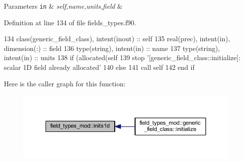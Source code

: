 \begin{DoxyParams}[1]{Parameters}
\mbox{\tt in}  & {\em self,name,units,field} & \\
\hline
\end{DoxyParams}


Definition at line 134 of file fields\+\_\+types.\+f90.


\begin{DoxyCode}
134     \textcolor{keywordtype}{class}(generic\_field\_class), \textcolor{keywordtype}{intent(inout)} :: self
135     \textcolor{keywordtype}{real(prec)}, \textcolor{keywordtype}{intent(in)}, \textcolor{keywordtype}{dimension(:)} :: field
136     \textcolor{keywordtype}{type}(string), \textcolor{keywordtype}{intent(in)} :: name
137     \textcolor{keywordtype}{type}(string), \textcolor{keywordtype}{intent(in)} :: units
138     \textcolor{keywordflow}{if} (\textcolor{keyword}{allocated}(self%
139         stop \textcolor{stringliteral}{'[generic\_field\_class::initialize]: scalar 1D field already allocated'}
140     \textcolor{keywordflow}{else}
141         \textcolor{keyword}{call }self%
142 \textcolor{keywordflow}{    end if}
\end{DoxyCode}
Here is the caller graph for this function\+:\nopagebreak
\begin{figure}[H]
\begin{center}
\leavevmode
\includegraphics[width=350pt]{namespacefield__types__mod_ae4985a4f37aad76b5bd9d4fdbdec8ff3_icgraph}
\end{center}
\end{figure}
\mbox{\label{namespacefield__types__mod_a55a57c6fa8c785a5f529ca577a677845}} 
